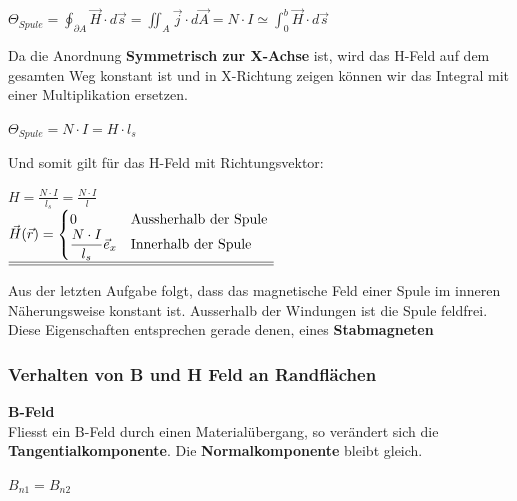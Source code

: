 \begin{center}

	$\displaystyle \Theta_{Spule} = \oint_{\partial A} \vec{H} \cdot d\vec{s} = \iint_{A} \vec{j} \cdot d\vec{A} = N \cdot I \simeq \int_0^b \vec{H} \cdot d\vec{s}$

	\end{center}
	Da die Anordnung \textbf{Symmetrisch zur X-Achse} ist, wird das H-Feld auf dem gesamten Weg konstant ist und in X-Richtung zeigen können wir das Integral mit einer Multiplikation ersetzen.
	\begin{center}

	$ \displaystyle \Theta_{Spule} = N \cdot I = H \cdot l_{s}$

	\end{center}
	Und somit gilt für das H-Feld mit Richtungsvektor:
	\begin{center}

	$\displaystyle H = \frac{N\cdot I}{l_{s}}  = \frac{N\cdot I}{l}$ \\ \fspace
 	$\displaystyle
		\underline{\underline{   \vec{H}(\vec{r}) =
		\begin{cases}
0 & $Aussherhalb der Spule $\\
\displaystyle \frac{N\cdot I}{l_{s}} \vec{e}_x & $Innerhalb der Spule $\\
\end{cases}}}$

	\end{center}
	\iend


	Aus der letzten Aufgabe folgt, dass das magnetische Feld einer Spule im inneren Näherungsweise konstant ist. Ausserhalb der Windungen ist die Spule feldfrei. \\
	Diese Eigenschaften entsprechen gerade denen, eines \textbf{Stabmagneten}


\subsubsection{Verhalten von B und H Feld an Randflächen}
\fix \fix
\textbf{B-Feld} \\
Fliesst ein B-Feld durch einen Materialübergang, so verändert sich die \textbf{Tangentialkomponente}. Die \textbf{Normalkomponente} bleibt gleich.
\begin{center}
\end{center}
\formulaBegin
$ \displaystyle B_{n1} = B_{n2}$
\\ \fspace

